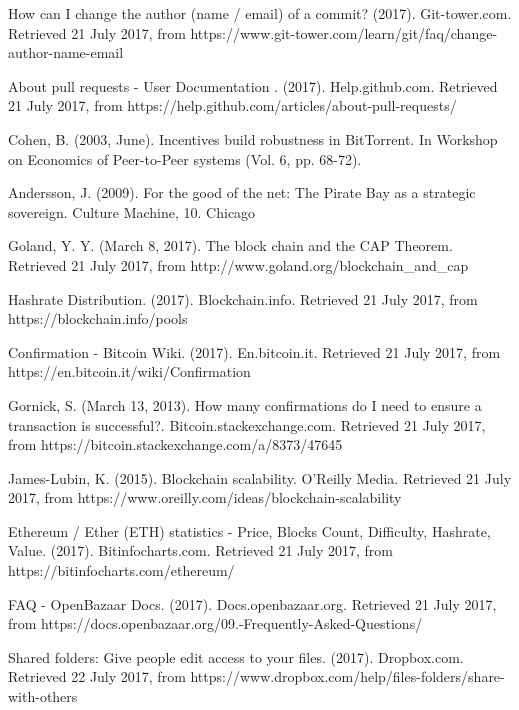 \begin{thebibliography}{99}
How can I change the author (name / email) of a commit? (2017). Git-tower.com. Retrieved 21 July 2017, from https://www.git-tower.com/learn/git/faq/change-author-name-email

About pull requests - User Documentation . (2017). Help.github.com. Retrieved 21 July 2017, from https://help.github.com/articles/about-pull-requests/

Cohen, B. (2003, June). Incentives build robustness in BitTorrent. In Workshop on Economics of Peer-to-Peer systems (Vol. 6, pp. 68-72).

Andersson, J. (2009). For the good of the net: The Pirate Bay as a strategic sovereign. Culture Machine, 10.
Chicago 

Goland, Y. Y. (March 8, 2017). The block chain and the CAP Theorem. Retrieved 21 July 2017, from http://www.goland.org/blockchain\_and\_cap

Hashrate Distribution. (2017). Blockchain.info. Retrieved 21 July 2017, from https://blockchain.info/pools

Confirmation - Bitcoin Wiki. (2017). En.bitcoin.it. Retrieved 21 July 2017, from https://en.bitcoin.it/wiki/Confirmation

Gornick, S. (March 13, 2013). How many confirmations do I need to ensure a transaction is successful?. Bitcoin.stackexchange.com. Retrieved 21 July 2017, from https://bitcoin.stackexchange.com/a/8373/47645

James-Lubin, K. (2015). Blockchain scalability. O'Reilly Media. Retrieved 21 July 2017, from https://www.oreilly.com/ideas/blockchain-scalability

Ethereum / Ether (ETH) statistics - Price, Blocks Count, Difficulty, Hashrate, Value. (2017). Bitinfocharts.com. Retrieved 21 July 2017, from https://bitinfocharts.com/ethereum/

FAQ - OpenBazaar Docs. (2017). Docs.openbazaar.org. Retrieved 21 July 2017, from https://docs.openbazaar.org/09.-Frequently-Asked-Questions/

Shared folders: Give people edit access to your files. (2017). Dropbox.com. Retrieved 22 July 2017, from https://www.dropbox.com/help/files-folders/share-with-others

\end{thebibliography}
